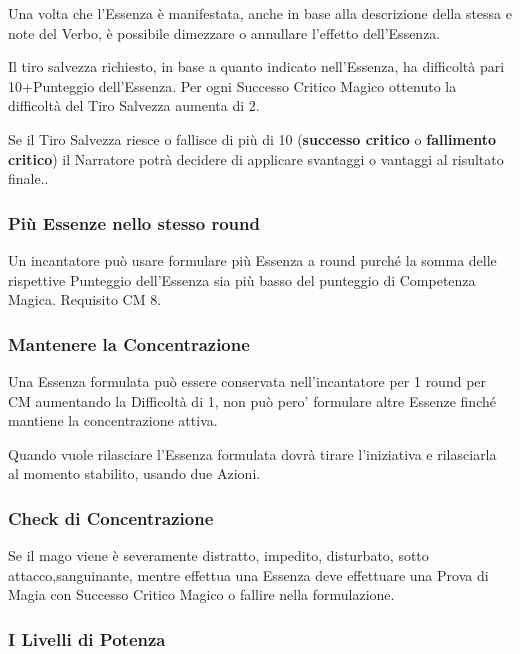 \documentclass[a4paper,twoside,openany]{book}
\begin{document}
\begin{multicols}{2}
\label{resistere-allessenza-tiro-salvezza}

Una volta che l'Essenza è manifestata, anche in base alla descrizione della stessa e note del Verbo, è possibile dimezzare o annullare l'effetto dell'Essenza.

Il tiro salvezza richiesto, in base a quanto indicato nell'Essenza, ha difficoltà pari 10+Punteggio dell'Essenza. Per ogni Successo Critico Magico ottenuto la difficoltà del Tiro Salvezza aumenta di 2.

Se il Tiro Salvezza riesce o fallisce di più di 10 (\textbf{successo critico} o \textbf{fallimento critico}) il Narratore potrà decidere di applicare svantaggi o vantaggi al risultato finale..

\subsubsection{Più Essenze nello stesso round}

Un incantatore può usare formulare più Essenza a round purché la somma delle rispettive Punteggio dell'Essenza sia più basso del punteggio di Competenza Magica. Requisito CM 8.

\subsubsection{Mantenere la Concentrazione}

Una Essenza formulata può essere conservata nell'incantatore per 1 round per CM aumentando la Difficoltà di 1, non può pero' formulare altre Essenze finché mantiene la concentrazione attiva.

Quando vuole rilasciare l'Essenza formulata dovrà tirare l'iniziativa e rilasciarla al momento stabilito, usando due Azioni.

\subsubsection{Check di Concentrazione}

Se il mago viene è severamente distratto, impedito, disturbato, sotto attacco,sanguinante, mentre effettua una Essenza deve effettuare una Prova di Magia con Successo Critico Magico o fallire nella formulazione.

\subsubsection{I Livelli di Potenza}


\end{multicols}
\end{document}
